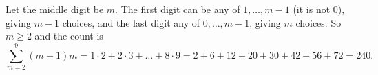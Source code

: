 Let the middle digit be $m$. The first digit can be any of $1,\dots,m-1$ (it is not $0$), giving $m-1$ choices, and the last digit any of $0,\dots,m-1$, giving $m$ choices. So $m\ge2$ and the count is
\[
\sum_{m=2}^{9}(m-1)m=1\cdot2+2\cdot3+\dots+8\cdot9=2+6+12+20+30+42+56+72=\boxed{240}.
\]
